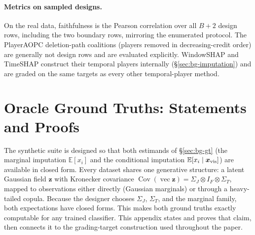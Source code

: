 \paragraph{Metrics on sampled designs.}
On the real data, faithfulness is the Pearson correlation over all $B{+}2$
design rows, including the two boundary rows, mirroring the enumerated
protocol.  The PlayerAOPC deletion-path coalitions (players removed in
decreasing-credit order) are generally not design rows and are evaluated
explicitly.  WindowSHAP and TimeSHAP construct their temporal players
internally (\S\ref{sec:bg-imputation}) and are graded on the same targets as
every other temporal-player method.

\section{Oracle Ground Truths: Statements and Proofs}
\label{app:oracle_proofs}

The synthetic suite is designed so that both estimands of
\S\ref{sec:bg-gt} (the marginal imputation $\mathbb{E}[x_i]$ and the conditional
imputation $\mathbb{E}[x_i \mid \bm{x}_{\mathrm{vis}}]$) are available in closed
form.  Every dataset shares one generative structure: a latent Gaussian
field $\bm{z}$ with Kronecker covariance
$\operatorname{Cov}(\operatorname{vec}\bm{z}) = \Sigma_J \otimes I_F
\otimes \Sigma_T$, mapped to observations either directly (Gaussian
marginals) or through a heavy-tailed copula.  Because the designer chooses
$\Sigma_J$, $\Sigma_T$, and the marginal family, both expectations have
closed forms.  This makes both ground truths exactly computable for any trained
classifier.  This appendix states and proves that claim, then connects it to
the grading-target construction used throughout the paper.

